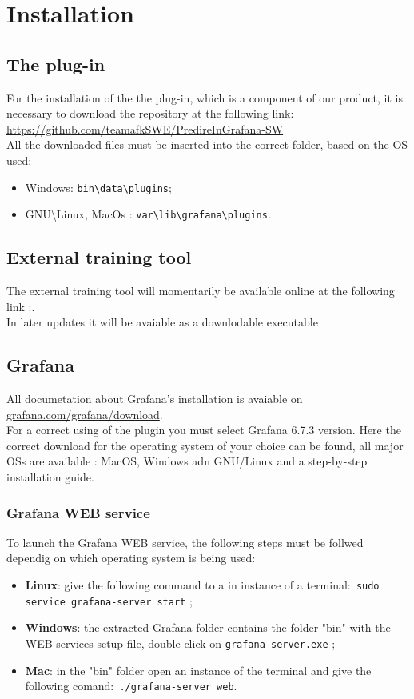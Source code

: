 \section{Installation}
\subsection{The plug-in}
For the installation of the the plug-in, which is a component of our product,  it is necessary to download the repository at the following link:\\ \url{https://github.com/teamafkSWE/PredireInGrafana-SW}\\
All the downloaded files must be inserted into the correct folder, based on the OS used:
\begin{itemize} 
\item Windows: \texttt{bin\textbackslash data\textbackslash plugins};
\item GNU\textbackslash Linux, MacOs : \texttt{var\textbackslash lib\textbackslash grafana\textbackslash plugins}.
\end{itemize}

\subsection{External training tool}
The external training tool will momentarily be available online at the following link :\url{}.\\
In later updates it will be avaiable as a downlodable executable

\subsection{Grafana}
All documetation about Grafana's installation is avaiable on  \url{grafana.com/grafana/download}.\\For a correct using of the plugin you must select Grafana 6.7.3 version.
Here the correct download for the operating system of your choice can be found, all major OSs are available : MacOS, Windows adn GNU\slash Linux and a step-by-step installation guide.
\subsubsection{Grafana WEB service}

To launch the Grafana WEB service, the following steps must be follwed dependig on which operating system is being used:

\begin{itemize}
\item\textbf{Linux}: give the following command to a in instance of a terminal:\texttt{ sudo service grafana-server start} ;
\item\textbf{Windows}: the extracted Grafana folder contains the folder "bin" with the WEB services setup file, double click on \texttt{grafana-server.exe} ;
\item\textbf{Mac}: in the "bin" folder open an instance of the  terminal and give the following comand:\texttt{ ./grafana-server web}.
\end{itemize}

